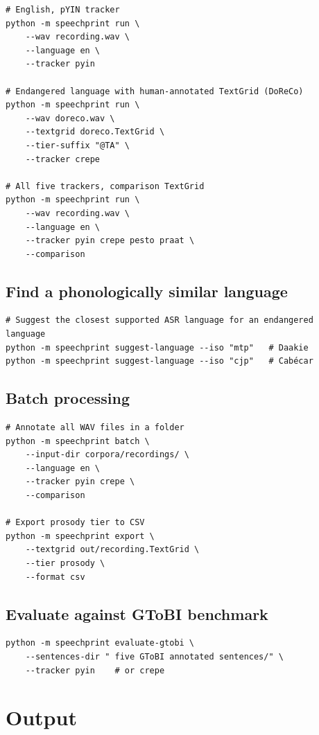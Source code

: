 \begin{verbatim}
# English, pYIN tracker
python -m speechprint run \
    --wav recording.wav \
    --language en \
    --tracker pyin

# Endangered language with human-annotated TextGrid (DoReCo)
python -m speechprint run \
    --wav doreco.wav \
    --textgrid doreco.TextGrid \
    --tier-suffix "@TA" \
    --tracker crepe

# All five trackers, comparison TextGrid
python -m speechprint run \
    --wav recording.wav \
    --language en \
    --tracker pyin crepe pesto praat \
    --comparison
\end{verbatim}

\subsection*{Find a phonologically similar language}

\begin{verbatim}
# Suggest the closest supported ASR language for an endangered language
python -m speechprint suggest-language --iso "mtp"   # Daakie
python -m speechprint suggest-language --iso "cjp"   # Cabécar
\end{verbatim}

\subsection*{Batch processing}

\begin{verbatim}
# Annotate all WAV files in a folder
python -m speechprint batch \
    --input-dir corpora/recordings/ \
    --language en \
    --tracker pyin crepe \
    --comparison

# Export prosody tier to CSV
python -m speechprint export \
    --textgrid out/recording.TextGrid \
    --tier prosody \
    --format csv
\end{verbatim}

\subsection*{Evaluate against GToBI benchmark}

\begin{verbatim}
python -m speechprint evaluate-gtobi \
    --sentences-dir " five GToBI annotated sentences/" \
    --tracker pyin    # or crepe
\end{verbatim}

\section*{Output}

